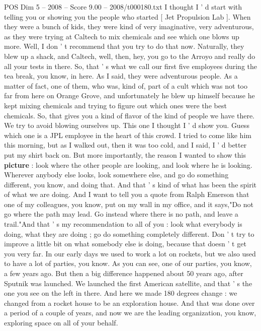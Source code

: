 \begin{textsample}{POS Dim 5 – 2008 – Score 9.00 – 2008/t000180.txt}  \label{ex:f5_pos_015}
I thought I ' d start with telling you or showing you the people who started [ Jet Propulsion Lab ].
When they were a bunch of kids, they were kind of very imaginative, very adventurous, as they were trying at Caltech to mix chemicals and see which one blows up more.
Well, I don ' t recommend that you try to do that now.
Naturally, they blew up a shack, and Caltech, well, then, hey, you go to the Arroyo and really do all your tests in there.
So, that ' s what we call our first five employees during the tea break, you know, in here.
As I said, they were adventurous people.
As a matter of fact, one of them, who was, kind of, part of a cult which was not too far from here on Orange Grove, and unfortunately he blew up himself because he kept mixing chemicals and trying to figure out which ones were the best chemicals.
So, that gives you a kind of flavor of the kind of people we have there.
We try to avoid blowing ourselves up.
This one I thought I ' d show you.
Guess which one is a JPL employee in the heart of this crowd.
I tried to come like him this morning, but as I walked out, then it was too cold, and I said, I ' d better put my shirt back on.
But more importantly, the reason I wanted to show this \textbf{picture} : look where the other people are looking, and look where he is looking.
Wherever anybody else looks, look somewhere else, and go do something different, you know, and doing that.
And that ' s kind of what has been the spirit of what we are doing.
And I want to tell you a quote from Ralph Emerson that one of my colleagues, you know, put on my wall in my office, and it says,"Do not go where the path may lead.
Go instead where there is no path, and leave a trail."And that ' s my recommendation to all of you : look what everybody is doing, what they are doing ; go do something completely different.
Don ' t try to improve a little bit on what somebody else is doing, because that doesn ' t get you very far.
In our early days we used to work a lot on rockets, but we also used to have a lot of parties, you know.
As you can see, one of our parties, you know, a few years ago.
But then a big difference happened about 50 years ago, after Sputnik was launched.
We launched the first American satellite, and that ' s the one you see on the left in there.
And here we made 180 degrees change : we changed from a rocket house to be an exploration house.
And that was done over a period of a couple of years, and now we are the leading organization, you know, exploring space on all of your behalf.

\end{textsample}
